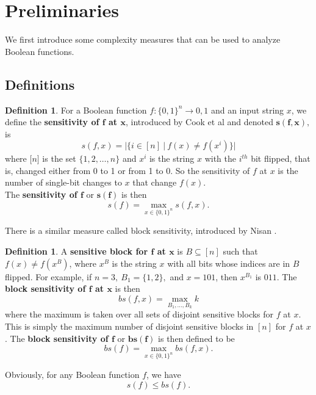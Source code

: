 \documentclass[psamsfonts]{amsart}
\theoremstyle{definition}
\newtheorem{defn}[theorem]{Definition}
\theoremstyle{remark}
\numberwithin{equation}{section}
\begin{document}
	\section{Preliminaries}
		We first introduce some complexity measures that can be used to analyze Boolean functions.  

	\subsection{Definitions}
\begin{defn}\label{sensitivity}
For a Boolean function $f: \{0,1\}^n \to {0,1}$ and an input string $x$, we define the \textbf{sensitivity of $\boldsymbol{f}$ at $\boldsymbol{x}$}, introduced by Cook et al \cite{CDR} and denoted $\boldsymbol{s(f,x)},$ is $$s(f,x) =|\{i \in [n] \: | \: f(x) \neq f(x^{i})\}|$$ where 
$\lbrack n \rbrack$ is the set 
$\{1,2,\ldots ,n\}$ and 
$x^{i}$ is the string $x$ with the $i^{th}$ bit flipped, 
that is, changed either from 0 to 1 or from 1 to 0.  So the sensitivity of $f$ at $x$ is the number of single-bit changes to $x$ that change $f(x)$.  
\\
The \textbf{sensitivity of $\boldsymbol{f}$} or $\boldsymbol{s(f)}$ is then $$s(f) = \max\limits_{x \in \{0,1\}^{n}} s(f,x).$$
\end{defn}

There is a similar measure called block sensitivity, introduced by Nisan \cite{N}.  
\begin{defn}\label{blocksensitivity}
A \textbf{sensitive block for $\boldsymbol{f}$ at $\boldsymbol{x}$} is $B \subseteq [n]$ such that 
$f(x) \neq f(x^{B})$, where $x^{B}$ is the string $x$ with all bits whose indices are in $B$ flipped.
For example, if $n=3, \: B_{1} = \{1,2\},$ and $x=101$, then $x^{B_{1}}$ is $011$.  
The \textbf{block sensitivity of $\boldsymbol{f}$ at $\boldsymbol{x}$} is then
$$bs(f,x) = \max_{B_{1}, \ldots , B_{k}} k$$ 
where the maximum is taken over all sets of disjoint sensitive blocks for $f$ at $x$.  This is simply the maximum number of disjoint sensitive blocks in $[n]$ for $f$ at $x$.
The \textbf{block sensitivity of $\boldsymbol{f}$} or $\boldsymbol{bs(f)}$ is then defined to be
$$bs(f) = \max\limits_{x \in \{0,1\}^{n}} bs(f,x).$$
\end{defn}

Obviously, for any Boolean function $f$, we have 
		\begin{equation}
			s(f) \leq bs(f). \nonumber
		\end{equation}
		
\end{document}
